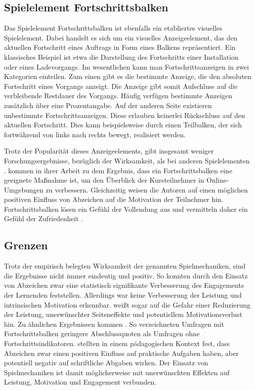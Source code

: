 \subsection{Spielelement Fortschrittsbalken}
Das Spielelement Fortschrittsbalken ist ebenfalls ein etabliertes visuelles Spielelement.
Dabei handelt es sich um ein visuelles Anzeigeelement, das den aktuellen Fortschritt eines Auftrags in Form eines Balkens repräsentiert. Ein klassisches Beispiel ist etwa die Darstellung des Fortschritts einer Installation oder eines Ladevorgangs. Im wesentlichen kann man Fortschrittsanzeigen in zwei Kategorien einteilen. Zum einen gibt es die bestimmte Anzeige, die den absoluten Fortschritt eines Vorgangs anzeigt. Die Anzeige gibt somit Aufschluss auf die verbleibende Restdauer des Vorgangs. Häufig verfügen bestimmte Anzeigen zusätzlich über eine Prozentangabe. Auf der anderen Seite existieren unbestimmte Fortschrittsanzeigen. Diese erlauben keinerlei Rückschluss auf den aktuellen Fortschritt. Dies kann beispielsweise durch einen Teilbalken, der sich fortwährend von links nach rechts bewegt, realisiert werden.

Trotz der Popularität dieses Anzeigeelements, gibt insgesamt weniger Forschungsergebnisse, bezüglich der Wirksamkeit, als bei anderen Spielelementen \cite{koivisto_rise_2019}.
 kommen in ihrer Arbeit zu dem Ergebnis, dass ein Fortschrittsbalken eine geeignete Maßnahme ist, um den Überblick der Kursteilnehmer in Online-Umgebungen zu verbessern. Gleichzeitig weisen die Autoren auf einen möglichen positiven Einfluss von Abzeichen auf die Motivation der Teilnehmer hin. Fortschrittsbalken lösen ein Gefühl der Vollendung aus und vermitteln daher ein Gefühl der Zufriedenheit \cite{ryan_deci_2000}.

\subsection{Grenzen}
Trotz der empirisch belegten Wirksamkeit der genannten Spielmechaniken, sind die Ergebnisse nicht immer eindeutig und positiv.
So konnten \citeauthor{ortiz_gamification_2017} durch den Einsatz von Abzeichen zwar eine statistisch signifikante Verbesserung des Engagements der Lernenden feststellen.
Allerdings war keine Verbesserung der Leistung und intrinsischen Motivation erkennbar.
\citeauthor{toda_dark_2018} weißt sogar auf die Gefahr einer Reduzierung der Leistung, unerwünschter Seiteneffekte und potentiellem Motivationsverlust hin.
Zu ähnlichen Ergebnissen kommen \citeauthor{liu_examining_2017}.
So verzeichneten Umfragen mit Fortschrittsbalken geringere Abschlussquoten als Umfragen ohne Fortschrittsindikatoren. \citeauthor{dominguez_gamifying_2013} stellten in einem pädagogischen Kontext fest, dass Abzeichen zwar einen positiven Einfluss auf praktische Aufgaben haben, aber potentiell negativ auf schriftliche Abgaben wirken. Der Einsatz von Spielmechaniken ist damit möglicherweise mit unerwünschten Effekten auf Leistung, Motivation und Engagement verbunden.


